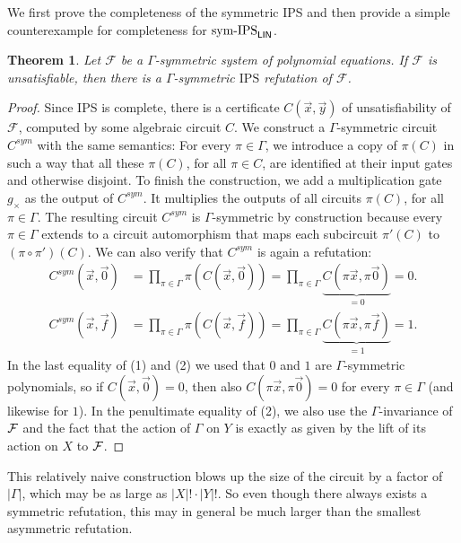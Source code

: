 \documentclass[10pt,a4paper]{article}
\newtheorem{theorem}{Theorem}
\newcommand{\IPS}{\mathrm{IPS}}
\newcommand{\Ff}{{\cal F}}
\newcommand{\Circ}{C} %
\newcommand{\F}{\ensuremath{\mathcal{F}}}
\newcommand{\symIPSlin}{\text{ \upshape sym-IPS}_{\mathsf{LIN}}}
\begin{document}
We first prove the completeness of the symmetric IPS and then provide a simple counterexample for completeness for$\symIPSlin$. 
\begin{theorem}
	\label{thm:symIPScomplete}
	Let $\F$ be a $\Gamma$-symmetric system of polynomial equations.
	If $\F$ is unsatisfiable, then there
	is a $\Gamma$-symmetric $\IPS$ refutation of $\F$.
\end{theorem}
\begin{proof}
	Since IPS is complete, there is a certificate $C(\vec x, \vec y)$
	of unsatisfiability of $\F$, computed by some algebraic circuit $C$. We construct a $\Gamma$-symmetric circuit $\Circ^{sym}$ with the same semantics: For every $\pi \in \Gamma$, we introduce a copy of $\pi(C)$ in such a way that all these $\pi(C)$, for all $\pi \in C$, are identified at their input gates and otherwise disjoint. 
	To finish the construction, we add a multiplication gate $g_\times$ as the output of $\Circ^{sym}$. 
	It multiplies the outputs of all circuits $\pi(C)$, for all $\pi \in \Gamma$.
	The resulting circuit $\Circ^{sym}$ is $\Gamma$-symmetric by construction because every $\pi \in \Gamma$ extends to a circuit automorphism
	that maps each subcircuit $\pi'(C)$ to $(\pi \circ \pi')(C)$. We can also verify that $\Circ^{sym}$ is again a refutation:
	\begin{align}
		\Circ^{sym}(\vec x, \vec 0)
		 &= \prod_{\pi \in \Gamma}\pi (C(\vec x, \vec 0))
		 = \prod_{\pi \in \Gamma}\underbrace{C(\pi \vec x, \pi \vec 0)}_{= 0}
		= 0.\\
		{C}^{sym}(\vec x, \vec f)
		 &= \prod_{\pi \in \Gamma}\pi (C(\vec x, \vec f))
		 = \prod_{\pi \in \Gamma}\underbrace{C(\pi \vec x,\pi \vec f)}_{= 1}
		= 1.
	\end{align}	
	In the last equality of (1) and (2) we used that $0$ and $1$ are $\Gamma$-symmetric polynomials, so if $C(\vec x, \vec 0) = 0$, then also $C(\pi \vec x, \pi \vec 0) = 0$ for every $\pi \in \Gamma$ (and likewise for $1$).
	In the penultimate equality of (2), we also use the $\Gamma$-invariance of $\Ff$ and the fact that the action of $\Gamma$ on $Y$ is exactly as given by the lift of its action on $X$ to $\Ff$.
\end{proof}
This relatively naive construction blows up the size of the circuit by a factor of $|\Gamma|$, which may be as large as $|X|! \cdot |Y|!$. So even though there always exists a symmetric refutation, this may in general be much larger than the smallest asymmetric refutation.
\end{document}
